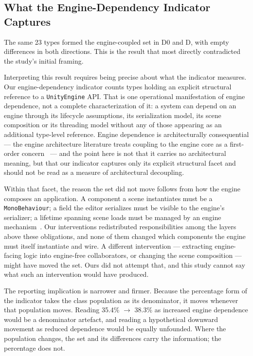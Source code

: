 \documentclass{sbc2019}%
\begin{document}
\subsection{What the Engine-Dependency Indicator Captures}

The same 23 types formed the engine-coupled set in D0 and D, with empty
differences in both directions. This is the result that most directly
contradicted the study's initial framing.

Interpreting this result requires being precise about what the indicator
measures. Our engine-dependency indicator counts types holding an explicit
structural reference to a \texttt{UnityEngine} API\@. That is one operational
manifestation of engine dependence, not a complete characterization of it: a
system can depend on an engine through its lifecycle assumptions, its
serialization model, its scene composition or its threading model without any of
those appearing as an additional type-level reference. Engine dependence is
architecturally consequential --- the engine architecture literature treats
coupling to the engine core as a first-order concern~\cite{politowski2025,ullmann2023}
--- and the point here is not that it carries
no architectural meaning, but that our indicator captures only its explicit
structural facet and should not be read as a measure of architectural decoupling.

Within that facet, the reason the set did not move follows from how the engine
composes an application. A component a scene instantiates must be a
\texttt{MonoBehaviour}; a field the editor serializes must be visible to the
engine's serializer; a lifetime spanning scene loads must be managed by an engine
mechanism~\cite{unitydocs}. Our interventions redistributed responsibilities
among the layers above these obligations, and none of them changed which
components the engine must itself instantiate and wire. A different intervention
--- extracting engine-facing logic into engine-free collaborators, or changing the
scene composition --- might have moved the set. Ours did not attempt that, and
this study cannot say what such an intervention would have produced.

The reporting implication is narrower and firmer. Because the percentage form of
the indicator takes the class population as its denominator, it moves whenever
that population moves. Reading 35.4\% $\rightarrow$ 38.3\% as increased engine
dependence would be a denominator artefact, and reading a hypothetical downward
movement as reduced dependence would be equally unfounded. Where the population
changes, the set and its differences carry the information; the percentage does
not.
\end{document}
